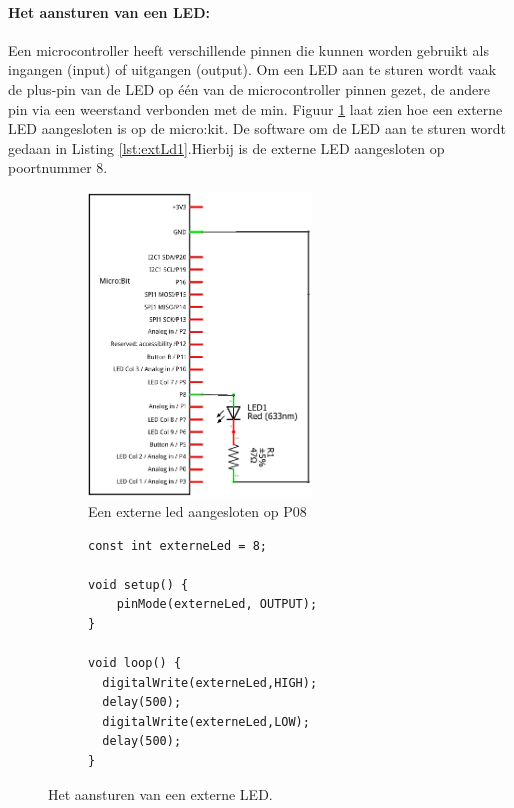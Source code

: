 \paragraph{Het aansturen van een LED:}
Een microcontroller heeft verschillende pinnen die kunnen worden gebruikt als ingangen (input) of uitgangen (output). 
Om een LED aan te sturen wordt vaak de plus-pin van de LED op één van de microcontroller pinnen gezet, de andere pin via een weerstand verbonden met de min. Figuur \ref{fig:exLd} laat zien hoe een externe LED aangesloten is op de micro:kit. De software om de LED  aan te sturen wordt gedaan in Listing \ref{lst:extLd1}.Hierbij is de externe LED aangesloten op poortnummer 8.
\begin{figure}[H]
	\centering
	\begin{center} 	
		\begin{subfigure}[b]{0.43\textwidth}
			\includegraphics[width=0.65\textwidth]{figuren/externeLedCr}
			\caption{Een externe led aangesloten op P08 }
			\label{fig:exLd}
			
		\end{subfigure}
		\begin{subfigure}[b]{0.46\textwidth}
\begin{lstlisting}[caption={Het aansturen van een externe LED.},label={lst:extLd1}]
const int externeLed = 8;
			
void setup() {
	pinMode(externeLed, OUTPUT);  
}
				
void loop() {
  digitalWrite(externeLed,HIGH);
  delay(500);
  digitalWrite(externeLed,LOW);
  delay(500); 
}
\end{lstlisting}
		\end{subfigure}
		\captionsetup{justification=centering}
		\caption{Het aansturen van een externe LED. }
		\label{fig:vbExtld}
	\end{center}	
\end{figure}


